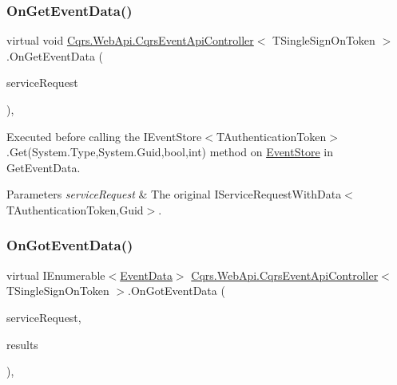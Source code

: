 \subsubsection{\texorpdfstring{On\+Get\+Event\+Data()}{OnGetEventData()}}
{\footnotesize\ttfamily virtual void \hyperlink{classCqrs_1_1WebApi_1_1CqrsEventApiController}{Cqrs.\+Web\+Api.\+Cqrs\+Event\+Api\+Controller}$<$ T\+Single\+Sign\+On\+Token $>$.On\+Get\+Event\+Data (\begin{DoxyParamCaption}\item[{\hyperlink{interfaceCqrs_1_1Services_1_1IServiceRequestWithData}{I\+Service\+Request\+With\+Data}$<$ T\+Single\+Sign\+On\+Token, Guid $>$}]{service\+Request }\end{DoxyParamCaption})\hspace{0.3cm}{\ttfamily [protected]}, {\ttfamily [virtual]}}



Executed before calling the I\+Event\+Store$<$\+T\+Authentication\+Token$>$.\+Get(\+System.\+Type,\+System.\+Guid,bool,int) method on \hyperlink{namespaceCqrs_1_1EventStore}{Event\+Store} in Get\+Event\+Data. 


\begin{DoxyParams}{Parameters}
{\em service\+Request} & The original I\+Service\+Request\+With\+Data$<$\+T\+Authentication\+Token,\+Guid$>$.\\
\hline
\end{DoxyParams}
\mbox{\label{classCqrs_1_1WebApi_1_1CqrsEventApiController_a9f0147c846a7fd7628d199ff268d178e_a9f0147c846a7fd7628d199ff268d178e}} 
\subsubsection{\texorpdfstring{On\+Got\+Event\+Data()}{OnGotEventData()}}
{\footnotesize\ttfamily virtual I\+Enumerable$<$\hyperlink{classCqrs_1_1Events_1_1EventData}{Event\+Data}$>$ \hyperlink{classCqrs_1_1WebApi_1_1CqrsEventApiController}{Cqrs.\+Web\+Api.\+Cqrs\+Event\+Api\+Controller}$<$ T\+Single\+Sign\+On\+Token $>$.On\+Got\+Event\+Data (\begin{DoxyParamCaption}\item[{\hyperlink{interfaceCqrs_1_1Services_1_1IServiceRequestWithData}{I\+Service\+Request\+With\+Data}$<$ T\+Single\+Sign\+On\+Token, Guid $>$}]{service\+Request,  }\item[{I\+Enumerable$<$ \hyperlink{classCqrs_1_1Events_1_1EventData}{Event\+Data} $>$}]{results }\end{DoxyParamCaption})\hspace{0.3cm}{\ttfamily [protected]}, {\ttfamily [virtual]}}



